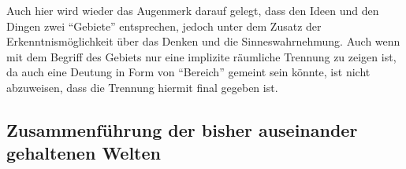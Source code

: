 Auch hier wird wieder das Augenmerk darauf gelegt, dass den Ideen und den Dingen zwei \enquote{Gebiete} entsprechen, jedoch unter dem Zusatz der Erkenntnismöglichkeit über das Denken und die Sinneswahrnehmung. Auch wenn mit dem Begriff des Gebiets nur eine implizite räumliche Trennung zu zeigen ist, da auch eine Deutung in Form von \enquote{Bereich} gemeint sein könnte, ist nicht abzuweisen, dass die Trennung hiermit final gegeben ist.



\subsection{Zusammenführung der bisher auseinander gehaltenen Welten}

